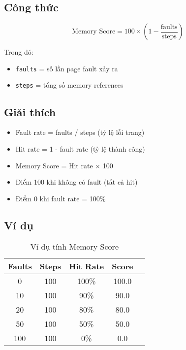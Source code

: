 \subsection{Công thức}

\begin{equation}
\text{Memory Score} = 100 \times \left(1 - \frac{\text{faults}}{\text{steps}}\right)
\end{equation}

Trong đó:
\begin{itemize}[leftmargin=1.5cm]
  \item \texttt{faults} = số lần page fault xảy ra
  \item \texttt{steps} = tổng số memory references
\end{itemize}

\subsection{Giải thích}

\begin{itemize}[leftmargin=1.5cm]
  \item Fault rate = faults / steps (tỷ lệ lỗi trang)
  \item Hit rate = 1 - fault rate (tỷ lệ thành công)
  \item Memory Score = Hit rate × 100
  \item Điểm 100 khi không có fault (tất cả hit)
  \item Điểm 0 khi fault rate = 100\%
\end{itemize}

\subsection{Ví dụ}

\begin{table}[H]
\centering
\caption{Ví dụ tính Memory Score}
\begin{tabular}{ccccc}
\toprule
\textbf{Faults} & \textbf{Steps} & \textbf{Hit Rate} & \textbf{Score} \\
\midrule
0 & 100 & 100\% & 100.0 \\
10 & 100 & 90\% & 90.0 \\
20 & 100 & 80\% & 80.0 \\
50 & 100 & 50\% & 50.0 \\
100 & 100 & 0\% & 0.0 \\
\bottomrule
\end{tabular}
\end{table}

